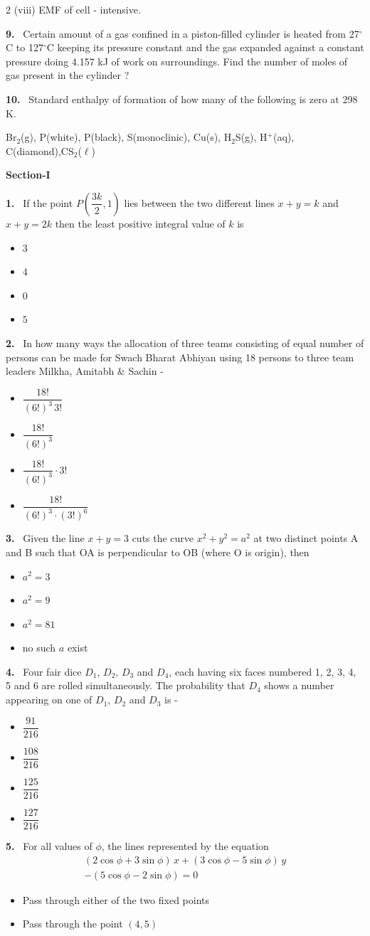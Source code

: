\documentclass[10pt]{extarticle}
\newcommand{\partsec}[2]{\par\medskip\noindent{\large\bfseries PART-#1: #2}\par\smallskip}
\newcommand{\sect}[1]{\par\smallskip\noindent\textbf{#1}\par}
\newcommand{\qn}[1]{\par\smallskip\noindent\textbf{#1.}~}
\newenvironment{qoptions}{\begin{itemize}[leftmargin=1.8em,itemsep=1pt,topsep=2pt,label={}]}{\end{itemize}}
\newcommand{\opt}[2]{\item[(#1)] #2}
\begin{document}
\begin{multicols}{2}
(viii) EMF of cell - intensive.
\qn{9} Certain amount of a gas confined in a piston-filled cylinder is heated from 27$^\circ$C to 127$^\circ$C keeping its pressure constant and the gas expanded against a constant pressure doing 4.157 kJ of work on surroundings. Find the number of moles of gas present in the cylinder ?
\qn{10} Standard enthalpy of formation of how many of the following is zero at 298 K.

Br$_2$(g), P(white), P(black), S(monoclinic), Cu(s), H$_2$S(g), H$^+$(aq), C(diamond),CS$_2$($\ell$)
\partsec{3}{MATHEMATICS}
\sect{Section-I}
\qn{1} If the point $P\left(\dfrac{3k}{2},1\right)$ lies between the two different lines $x+y=k$ and $x+y=2k$ then the least positive integral value of $k$ is
\begin{qoptions}
\opt{A}{$3$}
\opt{B}{$4$}
\opt{C}{$0$}
\opt{D}{$5$}
\end{qoptions}
\qn{2} In how many ways the allocation of three teams consisting of equal number of persons can be made for Swach Bharat Abhiyan using 18 persons to three team leaders Milkha, Amitabh \& Sachin -
\begin{qoptions}
\opt{A}{$\dfrac{18!}{(6!)^3\,3!}$}
\opt{B}{$\dfrac{18!}{(6!)^3}$}
\opt{C}{$\dfrac{18!}{(6!)^3}\cdot3!$}
\opt{D}{$\dfrac{18!}{(6!)^3\cdot(3!)^6}$}
\end{qoptions}
\qn{3} Given the line $x+y=3$ cuts the curve $x^2+y^2=a^2$ at two distinct points A and B such that OA is perpendicular to OB (where O is origin), then
\begin{qoptions}
\opt{A}{$a^2=3$}
\opt{B}{$a^2=9$}
\opt{C}{$a^2=81$}
\opt{D}{no such $a$ exist}
\end{qoptions}
\qn{4} Four fair dice $D_1$, $D_2$, $D_3$ and $D_4$, each having six faces numbered 1, 2, 3, 4, 5 and 6 are rolled simultaneously. The probability that $D_4$ shows a number appearing on one of $D_1$, $D_2$ and $D_3$ is -
\begin{qoptions}
\opt{A}{$\dfrac{91}{216}$}
\opt{B}{$\dfrac{108}{216}$}
\opt{C}{$\dfrac{125}{216}$}
\opt{D}{$\dfrac{127}{216}$}
\end{qoptions}
\qn{5} For all values of $\phi$, the lines represented by the equation
{\footnotesize\[\begin{gathered}(2\cos\phi+3\sin\phi)\,x+(3\cos\phi-5\sin\phi)\,y\\-(5\cos\phi-2\sin\phi)=0\end{gathered}\]}
\begin{qoptions}
\opt{A}{Pass through either of the two fixed points}
\opt{B}{Pass through the point $(4,5)$}

\end{qoptions}
\end{multicols}
\end{document}
